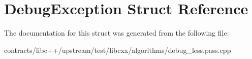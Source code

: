 \hypertarget{struct_debug_exception}{}\section{Debug\+Exception Struct Reference}
\label{struct_debug_exception}


The documentation for this struct was generated from the following file\+:\begin{DoxyCompactItemize}
\item 
contracts/libc++/upstream/test/libcxx/algorithms/debug\+\_\+less.\+pass.\+cpp\end{DoxyCompactItemize}
